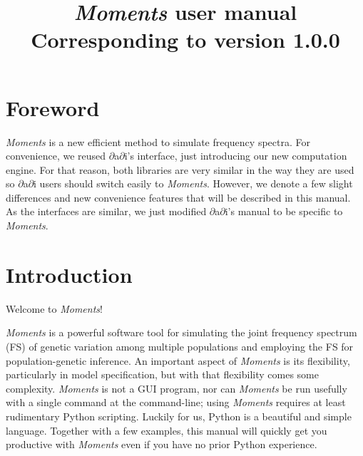 \documentclass[12pt]{article}
\newcommand{\dadi}{$\partial$a$\partial$i\xspace}
\begin{document}
\title{\textit{Moments} user manual\\\normalsize  Corresponding to version 1.0.0}
\date{}
\maketitle

\tableofcontents

\clearpage

\renewcommand*{\lstlistlistingname}{Example code}
\lstlistoflistings

\clearpage
\setcounter{section}{-1}
\section{Foreword}
\textit{Moments} is a new efficient method to simulate frequency spectra. For convenience, we reused \dadi's interface, just introducing our new computation engine. For that reason, both libraries are very similar in the way they are used so \dadi users should switch easily to \textit{Moments}. However, we denote a few slight differences and new convenience features that will be described in this manual. As the interfaces are similar, we just modified \dadi's manual to be specific to \textit{Moments}.

\section{Introduction}

Welcome to \textit{Moments}!

\textit{Moments} is a powerful software tool for simulating the joint frequency spectrum (FS) of genetic variation among multiple populations and employing the FS for population-genetic inference.
An important aspect of \textit{Moments} is its flexibility, particularly in model specification, but with that flexibility comes some complexity.
\textit{Moments} is not a GUI program, nor can \textit{Moments} be run usefully with a single command at the command-line; using \textit{Moments} requires at least rudimentary Python scripting.
Luckily for us, Python is a beautiful and simple language.
Together with a few examples, this manual will quickly get you productive with \textit{Moments} even if you have no prior Python experience.

\end{document}
